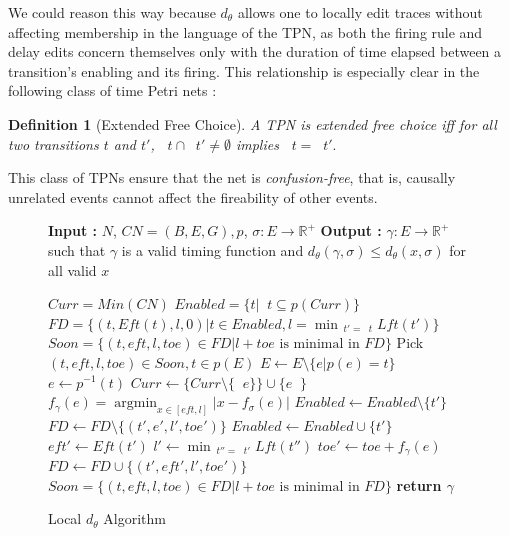 \documentclass[conference]{IEEEtran}
\makeatletter
\newcommand{\removelatexerror}{\let\@latex@error\@gobble}
\DeclareMathOperator*{\argmin}{argmin}
\DeclareMathOperator*{\pre}{^\bullet}
\newtheorem{definition}{Definition}
\makeatother
\begin{document}
		We could reason this way because $d_\theta$ allows one to locally edit traces without affecting membership in the language of the TPN, as both the firing rule and delay edits concern themselves only with the duration of time elapsed between a transition's enabling and its firing. 
		This relationship is especially clear in the following class of time Petri nets : 
		
			\begin{definition}[Extended Free Choice]\label{efc} A TPN is \textit{extended free choice} iff for all two transitions $t$ and $t'$, $\pre t \cap \pre t' \neq \emptyset$ implies $\pre t = \pre t'.$
	\end{definition}
	
	This class of TPNs ensure that the net is \textit{confusion-free}, that is, causally unrelated events cannot affect the fireability of other events. 
	\begin{figure}[!t]
			\removelatexerror
			\begin{algorithm}[H]
				\caption{Local $d_\theta$ Algorithm}
				\label{DelayAlgo}
				\begin{algorithmic}[1]
					\State \textbf{Input : }  $N$, $CN = (B, E, G), p$, $\sigma : E \to \mathbb{R}^+$
					\State \textbf{Output : }  $\gamma : E \to \mathbb{R}^+$ such that $\gamma$ is a valid timing function and $d_\theta(\gamma, \sigma)  \leq  {d_\theta(x, \sigma)}$ for all valid $x$ 
					
					\State $Curr = Min(CN)$
					\State $Enabled = \{t | \pre t \subseteq p(Curr)\}$
					\State $FD = \{(t, Eft(t), l, 0) | {t \in Enabled}, {l = \min_{\pre t' = \pre t}{Lft(t')}}\}$
					\State $Soon = \{{(t, eft, l, toe) \in FD} | {l+toe} \textrm{ is minimal in } FD\}$
					\State Pick $(t, eft, l, toe) \in Soon, {t \in p(E)}$ 
					\State $E \gets E \setminus\{e | p(e) = t\}$
					\State $e \gets p^{-1}(t)$
					\State $Curr \gets \{Curr \setminus \{\pre e\}\} \cup \{e \pre\} $
					\State $f_{\gamma}(e) = \argmin_{x \in [eft, l]}|x - f_{\sigma}(e)|$
					\ForAll{$t' \in T \wedge \pre t' = \pre t$} 
					\State $Enabled \gets Enabled \setminus\{t'\}$
					\State $FD \gets FD \setminus\{(t', e', l', toe')\}$
					\EndFor
					\ForAll{$t' \in T \wedge t' \pre = t \pre$}
					\State $Enabled \gets Enabled \cup \{t'\}$
					\State $eft' \gets Eft(t')$
					\State $l' \gets \min_{\pre t'' = \pre t'}{Lft(t'')}$
					\State $toe' \gets toe + f_\gamma(e)$
					\State $FD \gets FD \cup \{(t', eft', l', toe')\}$
					\EndFor
					\State $Soon = \{{(t, eft, l, toe) \in FD} | {l+toe} \textrm{ is minimal in } FD \}$
					\EndWhile
					\State \textbf{return $\gamma$}
				\end{algorithmic}
			\end{algorithm}
			
		\end{figure}
	
\end{document}
